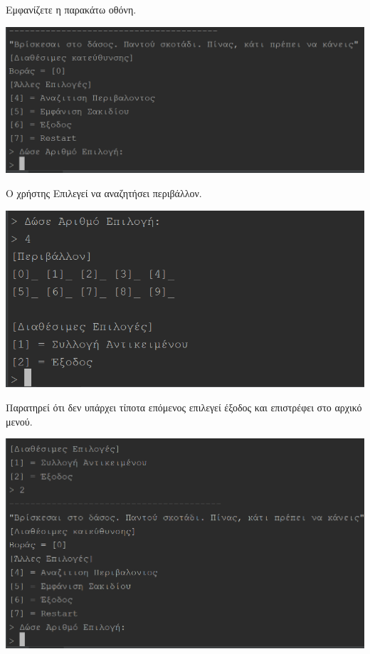 \noindent
Εμφανίζετε η παρακάτω οθόνη.
\begin{center}
			\includegraphics[width=1\textwidth]{image/2.1.PNG}
\end{center}

\noindent
Ο χρήστης Επιλεγεί να αναζητήσει περιβάλλον.

\begin{center}
			\includegraphics[width=1\textwidth]{image/2.2.PNG}
\end{center}

\noindent
Παρατηρεί ότι δεν υπάρχει τίποτα επόμενος επιλεγεί έξοδος και επιστρέφει στο αρχικό μενού.

\begin{center}
			\includegraphics[width=1\textwidth]{image/2.3.PNG}
\end{center}


